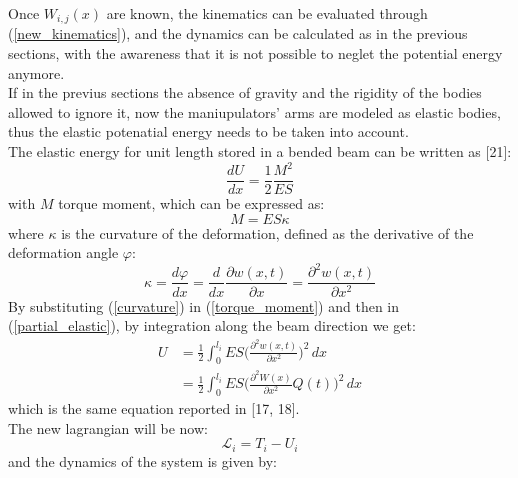 \documentclass[a4paper,12pt,oneside]{report}
\begin{document}
Once $W_{i,j}(x)$ are known, the kinematics can be evaluated through (\ref{new_kinematics}), and the dynamics can be calculated as in the previous sections, with the awareness that it is not possible to neglet the potential energy anymore.\\
If in the previus sections the absence of gravity and the rigidity of the bodies allowed to ignore it, now the maniupulators' arms are modeled as elastic bodies, thus the elastic potenatial energy needs to be taken into account.\\
The elastic energy for unit length stored in a bended beam can be written as [21]:
\begin{equation}
  \frac{dU}{dx}=\frac{1}{2}\frac{M^2}{ES}
  \label{partial_elastic}
\end{equation}
with $M$ torque moment, which can be expressed as:
\begin{equation}
  M=ES\kappa
  \label{torque_moment}
\end{equation}
where $\kappa$ is the curvature of the deformation, defined as the derivative of the deformation angle $\varphi$:
\begin{equation}
  \kappa=\frac{d\varphi}{dx}=\frac{d}{dx}\frac{\partial w(x,t)}{\partial x}=\frac{\partial^2 w(x,t)}{\partial x^2}
  \label{curvature}
\end{equation}
By substituting (\ref{curvature}) in (\ref{torque_moment}) and then in (\ref{partial_elastic}), by integration along the beam direction we get:
\begin{equation}
  \begin{split}
  U&=\frac{1}{2}\int_{0}^{l_i}ES\Big(\frac{\partial^2 w(x,t)}{\partial x^2}\Big)^2\,dx\\
   &=\frac{1}{2}\int_{0}^{l_i}ES\Big(\frac{\partial^2 W(x)}{\partial x^2}Q(t)\Big)^2\,dx
  \end{split}
\end{equation}
which is the same equation reported in [17, 18].\\
The new lagrangian will be now:
\begin{equation}
  \mathcal{L}_i = T_i-U_i
\end{equation}
and the dynamics of the system is given by:
\end{document}
